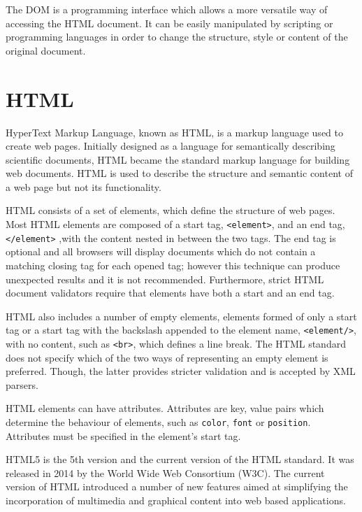 \documentclass[10pt,a4paper,twoside]{book}
\begin{document}
The DOM is a programming interface which allows a more versatile way of accessing the HTML document. It can be easily manipulated by scripting or programming languages in order to change the structure, style or content of the original document\cite{dom}.

\section{HTML}
HyperText Markup Language, known as HTML, is a markup language used to create web pages. Initially designed as a language for semantically describing scientific documents, HTML became the standard markup language for building web documents. HTML is used to describe the structure and semantic content of a web page but not its functionality\cite{world1999html}.

HTML consists of a set of elements, which define the structure of web pages. Most HTML elements are composed of a start tag, \texttt{<element>}, and an end tag, \texttt{</element>} ,with the content nested in between the two tags. The end tag is optional and all browsers will display documents which do not contain a matching closing tag for each opened tag; however this technique can produce unexpected results and it is not recommended. Furthermore, strict HTML document validators require that elements have both a start and an end tag\cite{world1999html}.

HTML also includes a number of empty elements, elements formed of only a start tag or a start tag with the backslash appended to the element name, \texttt{<element/>}, with no content, such as \texttt{<br>}, which defines a line break. The HTML standard does not specify which of the two ways of representing an empty element is preferred. Though, the latter provides stricter validation and is accepted by XML parsers\cite{world1999html}.

HTML elements can have attributes. Attributes are key, value pairs which determine the behaviour of elements, such as \texttt{color}, \texttt{font} or \texttt{position}. Attributes must be specified in the element's start tag\cite{world1999html}.

HTML5 is the 5th version and the current version of the HTML standard. It was released in 2014 by the World Wide Web Consortium (W3C). The current version of HTML introduced a number of new features aimed at simplifying the incorporation of multimedia and graphical content into web based applications\cite{berjon2014html}.
\end{document}
